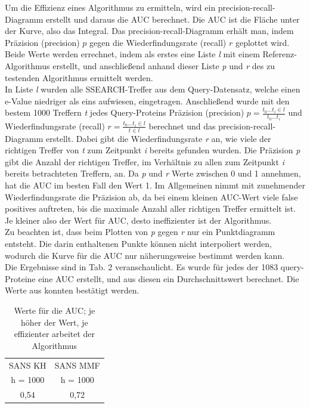 \documentclass{article}
\begin{document}
Um die Effizienz eines Algorithmus zu ermitteln, wird ein precision-recall-Diagramm erstellt und daraus die AUC berechnet. Die AUC ist die Fläche unter der Kurve, also das Integral. Das precision-recall-Diagramm erhält man, indem Präzision (precision) $p$ gegen die Wiederfindungsrate (recall) $r$ geplottet wird. Beide Werte werden errechnet, indem als erstes eine Liste \textit l mit einem Referenz-Algorithmus erstellt, und anschließend anhand dieser Liste \textit p und \textit r des zu testenden Algorithmus ermittelt werden.\\In Liste \textit l wurden alle SSEARCH-Treffer aus dem Query-Datensatz, welche einen e-Value niedriger als eins aufwiesen, eingetragen. Anschließend wurde mit den bestem 1000 Treffern \textit t jedes Query-Proteins Präzision (precision) $p = \frac{t_0 ... t_i \in l}{t_0 ... t_i}$ und Wiederfindungsrate (recall) $r = \frac {t_0 ... t_i \in l}{t \in l}$ berechnet und das precision-recall-Diagramm erstellt. Dabei gibt die Wiederfindungsrate \textit r an, wie viele der richtigen Treffer von \textit t zum Zeitpunkt \textit i bereits gefunden wurden. Die Präzision \textit p gibt die Anzahl der richtigen Treffer, im Verhältnis zu allen zum Zeitpunkt \textit i bereits betrachteten Treffern, an. Da \textit p und \textit r Werte zwischen 0 und 1 annehmen, hat die AUC im besten Fall den Wert 1. Im Allgemeinen nimmt mit zunehmender Wiederfindungsrate die Präzision ab, da bei einem kleinen AUC-Wert viele false positives auftreten, bis die maximale Anzahl aller richtigen Treffer ermittelt ist. Je kleiner also der Wert für AUC, desto ineffizienter ist der Algorithmus.\\Zu beachten ist, dass beim Plotten von \textit p gegen \textit r nur ein Punktdiagramm entsteht. Die darin enthaltenen Punkte können nicht interpoliert werden, wodurch die Kurve für die AUC nur näherungsweise bestimmt werden kann.\\Die Ergebnisse sind in Tab. 2 veranschaulicht. Es wurde für jedes der 1083 query-Proteine eine AUC erstellt, und aus diesen ein Durchschnittswert berechnet. Die Werte aus \cite{Holm} konnten bestätigt werden.


  \begin{table}[h]
    \centering
    \caption{Werte für die AUC; je höher der Wert, je effizienter arbeitet der Algorithmus}
    \begin{tabular}{cc}
      \hline
      SANS KH & SANS MMF\\
      h = 1000 & h = 1000 \\
      \hline
      0,54 & 0,72 \\
      \hline
    \end{tabular}
  \end{table}
\end{document}
